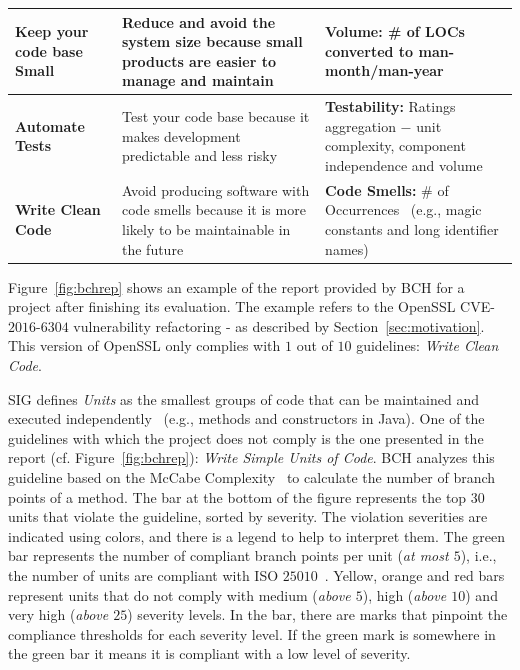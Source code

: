 \documentclass[10pt,conference]{IEEEtran}
\begin{document}
\begin{table}[h]
\begin{tabular}{L{1.66cm}L{3.3cm}L{2.7cm}}
\textbf{Keep your code base Small} & Reduce and avoid the system size because
small products are easier to manage and maintain & \textbf{Volume:} \# of LOCs converted 
to man-month/man-year~\cite{criteria:2017} \\\midrule

\textbf{Automate Tests} & Test your code base because it makes development
predictable and less risky & \textbf{Testability:} Ratings aggregation $-$ unit 
complexity, component independence and volume~\cite{Visser:2016:OREILLY}
 \\\midrule

\textbf{Write Clean Code} & Avoid producing software with code smells because
it is more likely to be maintainable in the future & \textbf{Code Smells:} 
\# of Occurrences~\cite{Visser:2016:OREILLY} (e.g., magic constants and long 
identifier names) \\
\bottomrule
\end{tabular}
\label{tab:guidelines}
\end{table}


Figure~\ref{fig:bchrep} shows an example of the report
provided by BCH for a project after finishing its evaluation. The example
refers to the OpenSSL CVE-$2016$-$6304$ vulnerability refactoring -
as described by Section~\ref{sec:motivation}. This
version of OpenSSL only complies with $1$ out of $10$ guidelines: \emph{Write
Clean Code}.

SIG defines \emph{Units} as the smallest groups of code that can be maintained
and executed independently~\cite{Visser:2016:OREILLY} (e.g., methods and
constructors in Java). One of the guidelines with which the project does not
comply is the one presented in the report (cf. Figure~\ref{fig:bchrep}):
\emph{Write Simple Units of Code}. BCH analyzes this guideline based on the
McCabe Complexity~\cite{1702388} to calculate the number of branch points of a
method. The bar at the bottom of the figure represents the top $30$ units that
violate the guideline, sorted by severity. The violation severities are
indicated using colors, and there is a legend to help to interpret them. The
green bar represents the number of compliant branch points per unit (\emph{at
most $5$}), i.e., the number of units are compliant with ISO
$25010$~\cite{iso:2011}. Yellow, orange and red bars represent units that do not
comply with medium (\emph{above $5$}), high (\emph{above $10$}) and very high
(\emph{above $25$}) severity levels. In the bar, there are marks that pinpoint
the compliance thresholds for each severity level. If the green mark is
somewhere in the green bar it means it is compliant with a low level of
severity.
\end{document}
